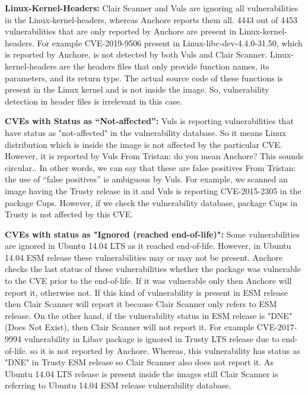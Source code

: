 \documentclass[a4paper,num-refs]{oup-contemporary}
\newcommand{\tristan}[1]{\color{blue}From Tristan: #1\color{black}}
\begin{document}

\textbf{Linux-Kernel-Headers:} Clair Scanner and Vuls are ignoring all vulnerabilities in the Linux-kernel-headers,
whereas Anchore reports them all.
4443 out of 4453 vulnerabilities that are only reported by Anchore are present in Linux-kernel-headers.
For example CVE-2019-9506 present in Linux-libc-dev-4.4.0-31.50, which is reported by Anchore, is not
detected by both Vuls and Clair Scanner.
Linux-kernel-headers are the headers files that only provide function names, its parameters, and its
return type.
The actual source code of these functions is present in the Linux kernel and is not inside the image.
So, vulnerability detection in header files
is irrelevant in this case.

\textbf{CVEs with Status as “Not-affected”:} Vuls is reporting vulnerabilities that have status
as "not-affected" in the vulnerability database. So it means Linux distribution which is inside the image is not affected
by the particular CVE. However, it is reported by Vuls \tristan{do you mean Anchore? This sounds circular.}. In other words, we can say that
these are false positives \tristan{the use of ``false positives'' is ambiguous} by Vuls.
For example, we scanned an image having the Trusty release in it and Vuls is reporting CVE-2015-2305
in the package Cups. However, if we check the vulnerability database, package Cups in Trusty is not
affected by this CVE.

\textbf{CVEs with status as "Ignored (reached end-of-life)":}
Some vulnerabilities are ignored in Ubuntu 14.04 LTS as it reached end-of-life. 
However, in Ubuntu 14.04 ESM release these vulnerabilities may or may not be present.
Anchore checks the last status of these vulnerabilities whether the package was vulnerable to the CVE
prior to the end-of-life. If it was vulnerable only then Anchore will report it, otherwise not.
If this kind of vulnerability is present in ESM release then Clair Scanner will report it because Clair Scanner
only refers to ESM release. On the other hand, if the vulnerability
status in ESM release is "DNE" (Does Not Exist), then Clair Scanner will not report it. 
For example CVE-2017-9994 vulnerability in Libav package is ignored in Trusty LTS release due to end-of-life.
so it is not reported by Anchore. Whereas, this vulnerability has status as "DNE" in Trusty ESM
release so Clair Scanner also does not report it. As Ubuntu 14.04 LTS release is present inside the images still
Clair Scanner is referring to Ubuntu 14.04 ESM release vulnerability database.
\end{document}
